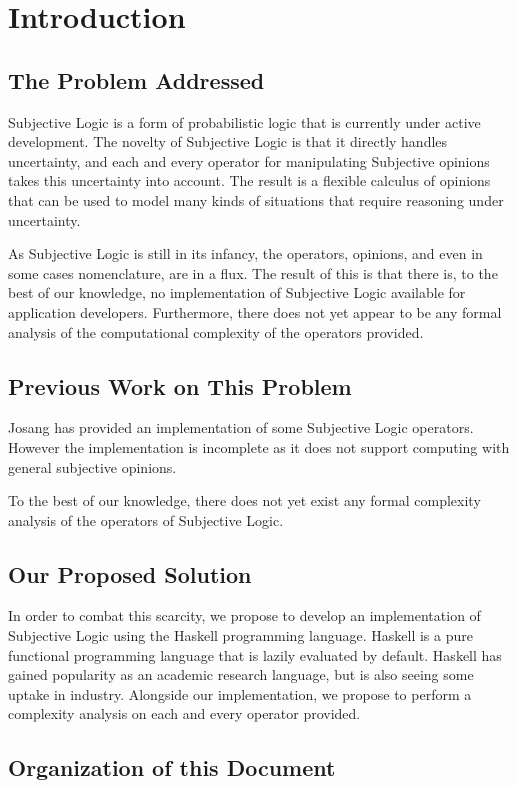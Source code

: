 \documentclass[thesis.tex]{subfiles}
\begin{document}
\chapter{Introduction}

\section{The Problem Addressed}

Subjective Logic is a form of probabilistic logic that is currently
under active development. The novelty of Subjective Logic is that it
directly handles uncertainty, and each and every operator for manipulating
Subjective opinions takes this uncertainty into account. The result is a
flexible calculus of opinions that can be used to model many kinds of
situations that require reasoning under uncertainty.

As Subjective Logic is still in its infancy, the operators, opinions, and
even in some cases nomenclature, are in a flux. The result of this is that
there is, to the best of our knowledge, no implementation of Subjective
Logic available for application developers. Furthermore, there does not
yet appear to be any formal analysis of the computational complexity of
the operators provided.


\section{Previous Work on This Problem}

Josang has provided an implementation of some Subjective Logic operators.
However the implementation is incomplete as it does not support computing
with general subjective opinions.

To the best of our knowledge, there does not yet exist any formal complexity
analysis of the operators of Subjective Logic.


\section{Our Proposed Solution}

In order to combat this scarcity, we propose to develop an implementation
of Subjective Logic using the Haskell programming language. Haskell is
a pure functional programming language that is lazily evaluated by default.
Haskell has gained popularity as an academic research language, but is also
seeing some uptake in industry. Alongside our implementation, we propose to
perform a complexity analysis on each and every operator provided.


\section{Organization of this Document}
\end{document}
